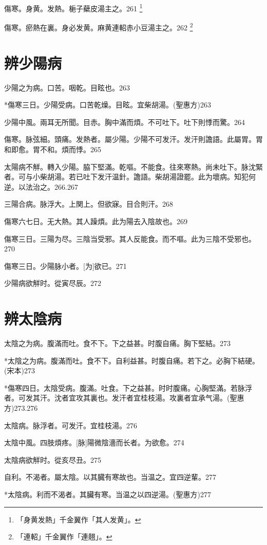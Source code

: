 \documentclass[12pt,twoside,UTF8,b5paper]{ctexbook}
\begin{document}
傷寒。身黄。发熱。梔子蘗皮湯主之。261
	\footnote{「身黄发熱」千金翼作「其人发黄」。}

傷寒。瘀熱在裏。身必发黄。麻黄連軺赤小豆湯主之。262
	\footnote{「連軺」千金翼作「連翹」。}

\chapter{辨少陽病}

少陽之为病。口苦。咽乾。目眩也。263

*傷寒三日。少陽受病。口苦乾燥。目眩。宜柴胡湯。(聖惠方)263

少陽中風。兩耳无所聞。目赤。胸中滿而煩。不可吐下。吐下則悸而驚。264

傷寒。脉弦細。頭痛。发熱者。屬少陽。少陽不可发汗。发汗則譫語。此屬胃。胃和即愈。胃不和。煩而悸。265

太陽病不觧。轉入少陽。脇下堅滿。乾嘔。不能食。往來寒熱。尚未吐下。脉沈緊者。可与小柴胡湯。若已吐下发汗温針。譫語。柴胡湯證罷。此为壞病。知犯何逆。以法治之。266.267

三陽合病。脉浮大。上関上。但欲寐。目合則汗。268

傷寒六七日。无大熱。其人躁煩。此为陽去入陰故也。269

傷寒三日。三陽为尽。三陰当受邪。其人反能食。而不嘔。此为三陰不受邪也。270

傷寒三日。少陽脉小者。[为]欲已。271

少陽病欲觧时。從寅尽辰。272

\chapter{辨太陰病}

太陰之为病。腹滿而吐。食不下。下之益甚。时腹自痛。胸下堅結。273

*太陰之为病。腹滿而吐。食不下。自利益甚。时腹自痛。若下之。必胸下結硬。(宋本)273

*傷寒四日。太陰受病。腹滿。吐食。下之益甚。时时腹痛。心胸堅滿。若脉浮者。可发其汗。沈者宜攻其裏也。发汗者宜桂枝湯。攻裏者宜承气湯。(聖惠方)273.276

太陰病。脉浮者。可发汗。宜桂枝湯。276

太陰中風。四肢煩疼。[脉]陽微陰濇而长者。为欲愈。274

太陰病欲觧时。從亥尽丑。275

自利。不渴者。屬太陰。以其臓有寒故也。当温之。宜四逆輩。277

*太陰病。利而不渴者。其臟有寒。当温之以四逆湯。(聖惠方)277
\end{document}
